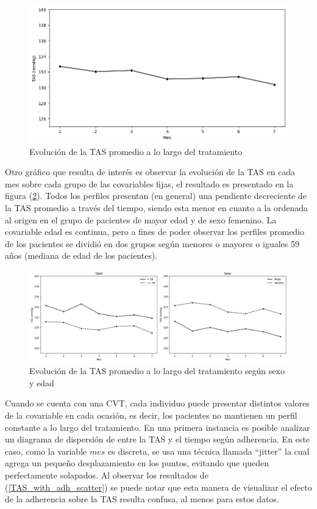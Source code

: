 \documentclass[spanish]{article}
\numberwithin{figure}{subsection}
\numberwithin{equation}{subsection}
\numberwithin{table}{subsection}
\begin{document}
\begin{figure}[H]
	\centering
	\includegraphics[scale=0.5]{img/TAS_vs_tpo.png}
	\caption{Evolución de la TAS promedio a lo largo del tratamiento}
	\label{TAS_vs_tpo}
\end{figure}

Otro gráfico que resulta de interés es observar la evolución de la TAS en cada
mes sobre cada grupo de las covariables fijas, el resultado es presentado en la
figura (\ref{TAS_with_covs}). Todos los perfiles presentan (en general) una
pendiente decreciente de la TAS promedio a través del tiempo, siendo esta menor
en cuanto a la ordenada al origen en el grupo de pacientes de mayor edad y de
sexo femenino. La covariable edad es continua, pero a fines de poder observar
los perfiles promedio de los pacientes se dividió en dos grupos según menores o
mayores o iguales 59 años (mediana de edad de los pacientes).

\begin{figure}[H]
	\centering
	\includegraphics[scale=0.4]{img/TAS_vs_tpo_with_covs.png}
	\caption{Evolución de la TAS promedio a lo largo del tratamiento según sexo y edad}
	\label{TAS_with_covs}
\end{figure}

Cuando se cuenta con una CVT, cada individuo puede presentar distintos valores
de la covariable en cada ocasión, es decir, los pacientes no mantienen un perfil
constante a lo largo del tratamiento. En una primera instancia es posible
analizar un diagrama de dispersión de entre la TAS y el tiempo según adherencia.
En este caso, como la variable $mes$ es discreta, se usa una técnica llamada
``jitter'' la cual agrega un pequeño desplazamiento en los puntos, evitando que
queden perfectamente solapados. Al observar los resultados de
(\ref{TAS_with_adh_scatter}) se puede notar que esta manera de visualizar el
efecto de la adherencia sobre la TAS resulta confusa, al menos para estos datos.
\end{document}
